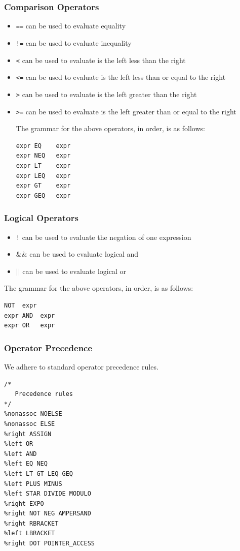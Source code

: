\documentclass{article}
\begin{document}
\subsubsection{Comparison Operators}
\begin{itemize}
\item \texttt{==} can be used to evaluate equality
\item \texttt{!=} can be used to evaluate inequality
\item \texttt{<} can be used to evaluate is the left less than the right
\item \texttt{<=} can be used to evaluate is the left less than or equal to the right
\item \texttt{>} can be used to evaluate is the left greater than the right
\item \texttt{>=} can be used to evaluate is the left greater than or equal to the right

The grammar for the above operators, in order, is as follows:
\begin{Verbatim}[frame=single]
expr EQ    expr
expr NEQ   expr
expr LT    expr
expr LEQ   expr
expr GT    expr
expr GEQ   expr
\end{Verbatim}
\end{itemize}

\subsubsection{Logical Operators}
\begin{itemize}
\item \texttt{!} can be used to evaluate the negation of one expression
\item \texttt{$\&\&$} can be used to evaluate logical and
\item \texttt{$\vert\vert$} can be used to evaluate logical or
\end{itemize}

The grammar for the above operators, in order, is as follows:
\begin{Verbatim}[frame=single]
NOT  expr
expr AND  expr
expr OR   expr
\end{Verbatim}

\subsubsection{Operator Precedence}
We adhere to standard operator precedence rules. 

\begin{Verbatim}[frame=single]
/*
   Precedence rules
*/
%nonassoc NOELSE
%nonassoc ELSE
%right ASSIGN
%left OR
%left AND
%left EQ NEQ
%left LT GT LEQ GEQ
%left PLUS MINUS
%left STAR DIVIDE MODULO
%right EXPO
%right NOT NEG AMPERSAND
%right RBRACKET
%left LBRACKET
%right DOT POINTER_ACCESS
\end{Verbatim}
\end{document}
